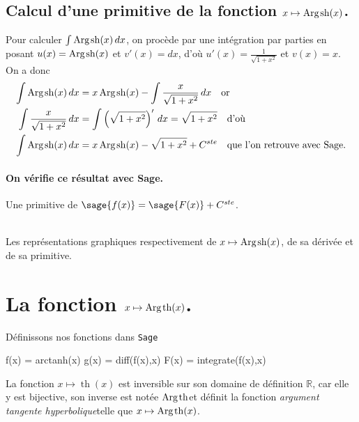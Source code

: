 \documentclass[a4paper,12pt]{report}
\def\eclaire{\mathbb}
\def\R{\ensuremath{\eclaire R}}
\renewcommand{\sinh}{\mathop{\mathrm{sh}}}
\renewcommand{\tanh}{\mathop{\mathrm{th}}}
\renewcommand{\arg}{\mathop{\mathrm{Arg}}}
\begin{document}
\subsection{Calcul d'une primitive de la fonction  $x \mapsto \arg\mspace{-1mu}\sinh(x)$.}
Pour calculer $\int \arg\mspace{-1mu}\sinh(x) \, dx$, on procède par une intégration par parties en posant $u(x) = \arg\mspace{-1mu}\sinh(x)$ et $v'(x) = dx$, d'où $u'(x) = \frac{1}{ \sqrt{1+x^2}}$ et $ v(x) = x $. \\
On a donc
\begin{align*}
\int \arg\mspace{-1mu}\sinh(x) \, dx & = x \arg\mspace{-1mu}\sinh(x) - \int \frac{x}{ \sqrt{1+x^2}} \, dx \quad \textrm{or}\\
\int \frac{x}{ \sqrt{1+x^2}} \, dx & = \int \left(\sqrt{1+x^2}\right)' \, dx = \sqrt{1+x^2}  \quad \textrm{d'où}\\
\int \arg\mspace{-1mu}\sinh(x) \, dx & = x \arg\mspace{-1mu}\sinh(x) - \sqrt{1+x^2} + C^{ste} \quad \textrm{que l'on retrouve avec Sage.}
\end{align*}
\paragraph{On vérifie ce résultat avec Sage.}
Une primitive de $\sage{f(x)} = \sage{F(x)} + C^{ste} $.

\begin{center}
\\
Les représentations graphiques respectivement de $x \mapsto \arg\mspace{-1mu}\sinh(x)$, de sa dérivée et de sa primitive.
\end{center}

\section{La fonction  $x \mapsto \arg\mspace{-1mu}\tanh(x)$.}
Définissons nos fonctions dans {\texttt{Sage}}
\begin{sageblock}
    f(x) = arctanh(x)
    g(x) = diff(f(x),x)
    F(x) = integrate(f(x),x)
\end{sageblock}

La fonction $x \mapsto \tanh(x)$ est inversible sur son domaine de définition $\R$, car elle y est bijective, son inverse est notée \og$ \arg\mspace{-1mu}\tanh $\fg et définit la fonction \og\emph{argument tangente hyperbolique}\fg telle que $x \mapsto \arg\mspace{-1mu}\tanh(x)$.
\end{document}
